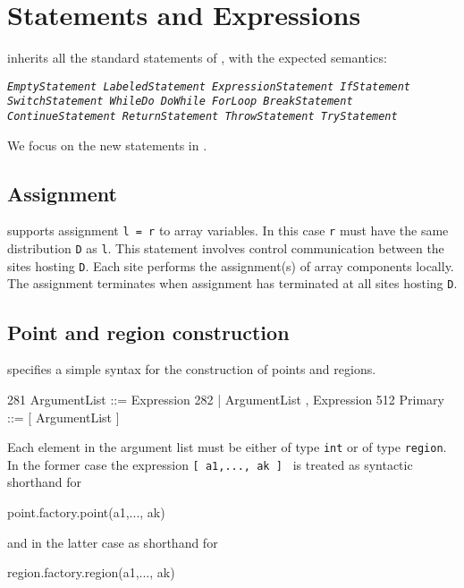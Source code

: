 \chapter{Statements and Expressions}\label{XtenStatements}

\Xten{} inherits all the standard statements of \Java{}, with the expected semantics:

\begin{x10}
\em\tt EmptyStatement      LabeledStatement  
\em\tt ExpressionStatement IfStatement
\em\tt SwitchStatement     WhileDo
\em\tt DoWhile             ForLoop           
\em\tt BreakStatement      ContinueStatement  
\em\tt ReturnStatement   ThrowStatement
\em\tt TryStatement
\end{x10}

We focus on the new statements in \Xten. 

\section{Assignment}\label{AssignmentStatement}

%

{}\Xten{} supports assignment {\tt l = r} to array variables. In this
case {\tt r} must have the same distribution {\tt D} as {\tt l}. This
statement involves control communication between the sites hosting
{\tt D}. Each site performs the assignment(s) of array components
locally. The assignment terminates when assignment has terminated at
all sites hosting {\tt D}.


\section{Point and region construction}\label{point-syntax}
\Xten{} specifies a simple syntax for the construction of points and regions.
\begin{x10}
281   ArgumentList ::= Expression
282      | ArgumentList , Expression
512   Primary ::= [ ArgumentList ]
\end{x10}
Each element in the argument list must be either of type {\tt int} or 
of type {\tt region}. In the former case the expression 
{\tt [ a1,..., ak ] } is treated as syntactic shorthand for
\begin{x10}
  point.factory.point(a1,..., ak)
\end{x10}
\noindent and in the latter case as shorthand for
\begin{x10}
  region.factory.region(a1,..., ak)
\end{x10}

